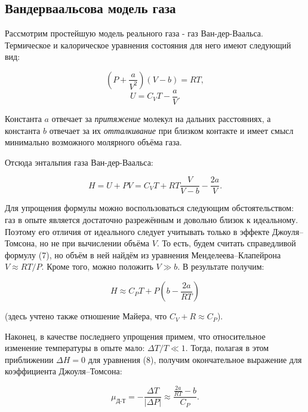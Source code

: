 \documentclass{article}
\begin{document}
\subsection*{Вандерваальсова модель газа}

\hspace{4mm} Рассмотрим простейшую модель реального газа - газ Ван-дер-Ваальса. Термическое и калорическое уравнения состояния для него имеют следующий вид:

\begin{equation}
\left( P + \frac{a}{V^2} \right) (V - b) = RT,
\end{equation}
\begin{equation}
U = C_V T - \frac{a}{V}. 
\end{equation}

Константа $a$ отвечает за \textit{притяжение} молекул на дальних расстояниях, а константа $b$ отвечает за их \textit{отталкивание} при близком контакте и имеет смысл минимально возможного молярного объёма газа. 

Отсюда энтальпия газа Ван-дер-Ваальса:

\begin{equation}
H = U + PV = C_V T + RT \frac{V}{V-b} - \frac{2a}{V}. 
\end{equation}

Для упрощения формулы можно воспользоваться следующим обстоятельством: газ в опыте является достаточно разрежённым и довольно близок к идеальному. Поэтому его отличия от идеального следует учитывать только в эффекте Джоуля–Томсона, но не при вычислении объёма $V$. То есть, будем считать справедливой формулу (7), но объём в ней найдём из уравнения Менделеева–Клапейрона $V \approx RT/P$. Кроме того, можно положить $V \gg b$. В результате получим:

\begin{equation}
H \approx C_P T + P \left( b - \frac{2a}{RT} \right) 
\end{equation}

(здесь учтено также отношение Майера, что $C_V + R \approx C_P$).

Наконец, в качестве последнего упрощения примем, что относительное изменение температуры в опыте мало: $\Delta T/T \ll 1$. Тогда, полагая в этом приближении $\Delta H = 0$ для уравнения (8), получим окончательное выражение для коэффициента Джоуля–Томсона:

\begin{equation}
\mu_{\text{Д-Т}} = -\frac{\Delta T}{|\Delta P|} \approx \frac{\frac{2a}{RT} - b}{C_P}. 
\end{equation}
\end{document}
